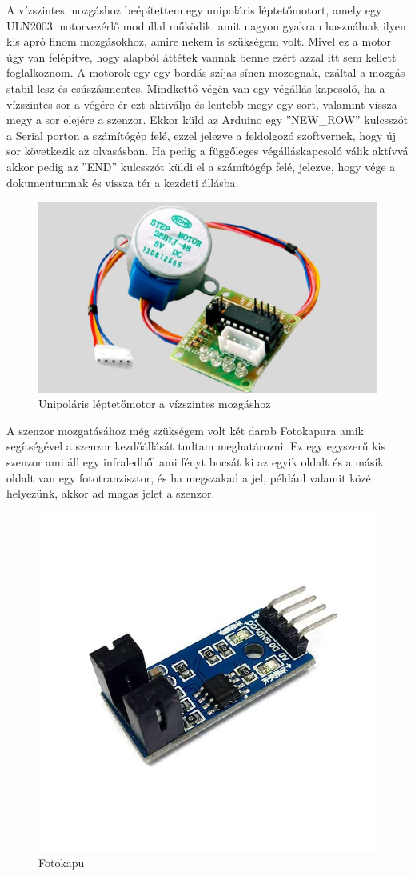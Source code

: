 \documentclass[]{thesis-ekf}
\theoremstyle{definition}
\theoremstyle{remark}
\begin{document}
	
	A vízszintes mozgáshoz beépítettem egy unipoláris léptetőmotort, amely egy ULN2003 motorvezérlő modullal működik, amit nagyon gyakran használnak ilyen kis apró finom mozgásokhoz, amire nekem is szükségem volt. Mivel ez a motor úgy van felépítve, hogy alapból áttétek vannak benne ezért azzal itt sem kellett foglalkoznom. A motorok egy egy bordás szíjas sínen mozognak, ezáltal a mozgás stabil lesz és csúszásmentes. Mindkettő végén van egy végállás kapcsoló, ha a vízszintes sor a végére ér ezt aktiválja és lentebb megy egy sort, valamint vissza megy a sor elejére a szenzor. Ekkor küld az Arduino egy ''NEW\_ROW'' kulcsszót a Serial porton a számítógép felé, ezzel jelezve a feldolgozó szoftvernek, hogy új sor következik az olvasásban. Ha pedig a függőleges végálláskapcsoló válik aktívvá akkor pedig az ''END'' kulcsszót küldi el a számítógép felé, jelezve, hogy vége a dokumentumnak és vissza tér a kezdeti állásba.
	
	\begin{figure}[th!]
		\centering
		\includegraphics[width=0.5\linewidth]{28BYJ-48-modul-ULN2003}
		\caption[Unipoláris léptetőmotor]{Unipoláris léptetőmotor a vízszintes mozgáshoz}
		\label{fig:28byj-48-modul-uln2003}
	\end{figure}
	
	A szenzor mozgatásához még szükségem volt két darab Fotokapura amik segítségével a szenzor kezdőállását tudtam meghatározni. Ez egy egyszerű kis szenzor ami áll egy infraledből ami fényt bocsát ki az egyik oldalt és a másik oldalt van egy fototranzisztor, és ha megszakad a jel, például valamit közé helyezünk, akkor ad magas jelet a szenzor. 
	\begin{figure}[th!]
		\centering
		\includegraphics[width=0.4\linewidth]{MH-Infrared-Speed-Sensor-Module}
		\caption[Infravörös kapu]{Fotokapu}
		\label{fig:mh-infrared-speed-sensor-module}
	\end{figure}
	
\end{document}
